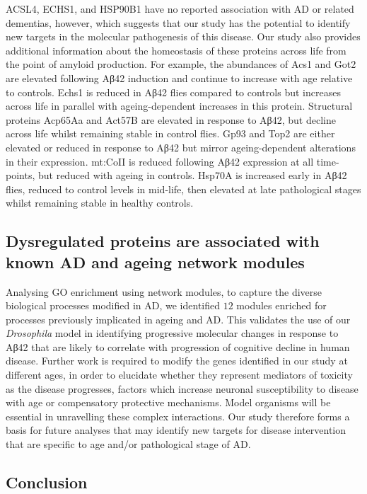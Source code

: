 ACSL4, ECHS1, and HSP90B1 have no reported association with AD or related dementias,
however, which suggests that our study has the potential to identify new targets
in the molecular pathogenesis of this disease.
Our study also provides additional information about the homeostasis of these proteins
across life from the point of amyloid production.
For example, the abundances of Acs1 and Got2 are elevated following Aβ42 induction
and continue to increase with age relative to controls.
Echs1 is reduced in Aβ42 flies compared to controls but increases across life
in parallel with ageing-dependent increases in this protein.
Structural proteins Acp65Aa and Act57B are elevated in response to Aβ42,
but decline across life whilst remaining stable in control flies.
Gp93 and Top2 are either elevated or reduced in response to Aβ42 but mirror
ageing-dependent alterations in their expression.
mt:CoII is reduced following Aβ42 expression at all time-points,
but reduced with ageing in controls.
Hsp70A is increased early in Aβ42 flies, reduced to control levels in mid-life,
then elevated at late pathological stages whilst remaining stable in healthy controls.

\subsection{Dysregulated proteins are associated with known AD and ageing network modules}

Analysing GO enrichment using network modules,
to capture the diverse biological processes modified in AD,
we identified $12$ modules enriched for processes previously implicated in ageing and AD.
This validates the use of our \textit{Drosophila} model in identifying progressive molecular changes
in response to Aβ42 that are likely to correlate with progression of cognitive decline
in human disease.
Further work is required to modify the genes identified in our study at different ages,
in order to elucidate whether they represent mediators of toxicity as the disease progresses,
factors which increase neuronal susceptibility to disease with age
or compensatory protective mechanisms.
Model organisms will be essential in unravelling these complex interactions.
Our study therefore forms a basis for future analyses that may identify new targets
for disease intervention that are specific to age and/or pathological stage of AD.

\subsection{Conclusion}

